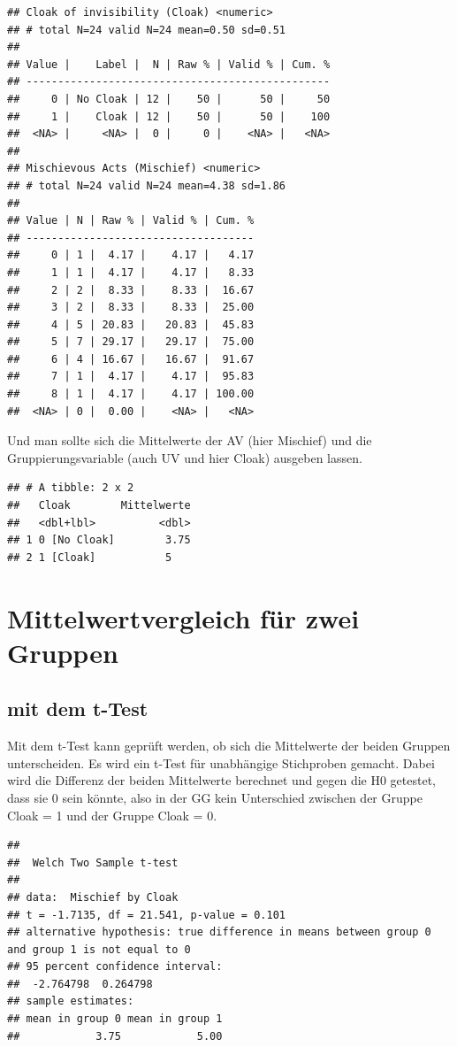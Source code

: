 \documentclass[
  10pt,
  letterpaper,
  a4paper, twoside]{scrreprt}
\begin{document}
\begin{verbatim}
## Cloak of invisibility (Cloak) <numeric> 
## # total N=24 valid N=24 mean=0.50 sd=0.51
## 
## Value |    Label |  N | Raw % | Valid % | Cum. %
## ------------------------------------------------
##     0 | No Cloak | 12 |    50 |      50 |     50
##     1 |    Cloak | 12 |    50 |      50 |    100
##  <NA> |     <NA> |  0 |     0 |    <NA> |   <NA>
## 
## Mischievous Acts (Mischief) <numeric> 
## # total N=24 valid N=24 mean=4.38 sd=1.86
## 
## Value | N | Raw % | Valid % | Cum. %
## ------------------------------------
##     0 | 1 |  4.17 |    4.17 |   4.17
##     1 | 1 |  4.17 |    4.17 |   8.33
##     2 | 2 |  8.33 |    8.33 |  16.67
##     3 | 2 |  8.33 |    8.33 |  25.00
##     4 | 5 | 20.83 |   20.83 |  45.83
##     5 | 7 | 29.17 |   29.17 |  75.00
##     6 | 4 | 16.67 |   16.67 |  91.67
##     7 | 1 |  4.17 |    4.17 |  95.83
##     8 | 1 |  4.17 |    4.17 | 100.00
##  <NA> | 0 |  0.00 |    <NA> |   <NA>
\end{verbatim}

Und man sollte sich die Mittelwerte der AV (hier Mischief) und die
Gruppierungsvariable (auch UV und hier Cloak) ausgeben lassen.

\begin{verbatim}
## # A tibble: 2 x 2
##   Cloak        Mittelwerte
##   <dbl+lbl>          <dbl>
## 1 0 [No Cloak]        3.75
## 2 1 [Cloak]           5
\end{verbatim}

\section{Mittelwertvergleich für zwei
Gruppen}\label{mittelwertvergleich-fuxfcr-zwei-gruppen}

\subsection{mit dem t-Test}\label{mit-dem-t-test}

Mit dem t-Test kann geprüft werden, ob sich die Mittelwerte der beiden
Gruppen unterscheiden. Es wird ein t-Test für unabhängige Stichproben
gemacht. Dabei wird die Differenz der beiden Mittelwerte berechnet und
gegen die H0 getestet, dass sie 0 sein könnte, also in der GG kein
Unterschied zwischen der Gruppe Cloak = 1 und der Gruppe Cloak = 0.

\begin{verbatim}
## 
##  Welch Two Sample t-test
## 
## data:  Mischief by Cloak
## t = -1.7135, df = 21.541, p-value = 0.101
## alternative hypothesis: true difference in means between group 0 and group 1 is not equal to 0
## 95 percent confidence interval:
##  -2.764798  0.264798
## sample estimates:
## mean in group 0 mean in group 1 
##            3.75            5.00
\end{verbatim}
\end{document}
